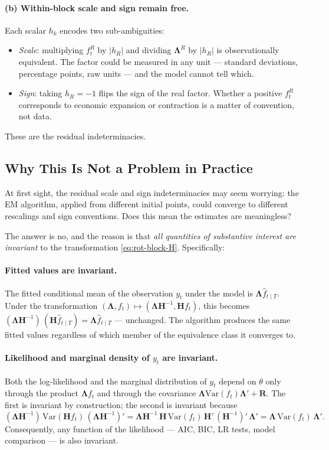 \documentclass[11pt, a4paper, oneside]{article}
\newcommand{\mL}{\boldsymbol{\Lambda}}
\begin{document}
\paragraph{(b) Within-block scale and sign remain free.}
Each scalar $h_k$ encodes two sub-ambiguities:
\begin{itemize}[leftmargin=1.5em, itemsep=2pt]
    \item \emph{Scale}: multiplying $f^R_t$ by $|h_R|$ and dividing
          $\mL^R$ by $|h_R|$ is observationally equivalent.
          The factor could be measured in any unit — standard
          deviations, percentage points, raw units — and the model
          cannot tell which.
    \item \emph{Sign}: taking $h_R = -1$ flips the sign of the
          real factor. Whether a positive $f^R_t$ corresponds to
          economic expansion or contraction is a matter of convention,
          not data.
\end{itemize}
These are the residual indeterminacies.

\subsection{Why This Is Not a Problem in Practice}
\label{subsec:rot-not-problem}

At first sight, the residual scale and sign indeterminacies may seem
worrying: the EM algorithm, applied from different initial points,
could converge to different rescalings and sign conventions. Does
this mean the estimates are meaningless?

The answer is no, and the reason is that \emph{all quantities of
substantive interest are invariant} to the transformation
\eqref{eq:rot-block-H}. Specifically:

\paragraph{Fitted values are invariant.}
The fitted conditional mean of the observation $y_t$ under the model
is $\mL \hat{f}_{t \mid T}$. Under the transformation
$(\mL, f_t) \mapsto (\mL \mathbf{H}^{-1}, \mathbf{H} f_t)$,
this becomes $(\mL \mathbf{H}^{-1})\, (\mathbf{H} \hat{f}_{t \mid T}) = \mL \hat{f}_{t \mid T}$ — unchanged. The algorithm produces the same
fitted values regardless of which member of the equivalence class it
converges to.

\paragraph{Likelihood and marginal density of $y_t$ are invariant.}
Both the log-likelihood and the marginal distribution of $y_t$ depend
on $\theta$ only through the product $\mL f_t$ and
through the covariance $\mL \mathrm{Var}(f_t) \mL' + \mathbf{R}$.
The first is invariant by construction; the second is invariant
because
\[
(\mL \mathbf{H}^{-1})\, \mathrm{Var}(\mathbf{H} f_t)\, (\mL \mathbf{H}^{-1})' = \mL \mathbf{H}^{-1}\, \mathbf{H}\, \mathrm{Var}(f_t)\, \mathbf{H}'\, (\mathbf{H}^{-1})'\, \mL' = \mL\, \mathrm{Var}(f_t)\, \mL'.
\]
Consequently, any function of the likelihood — AIC, BIC, LR tests,
model comparison — is also invariant.
\end{document}
